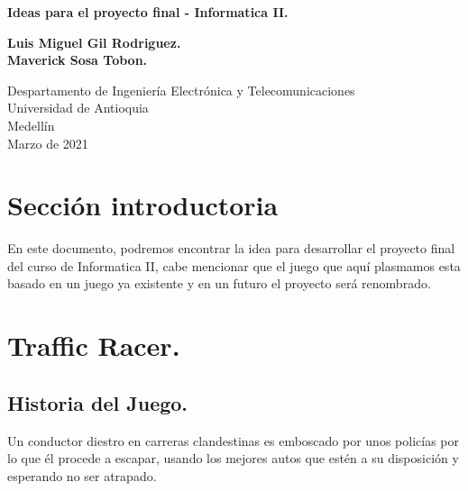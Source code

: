 \documentclass{article}
\begin{document}
\begin{titlepage}
    \begin{center}
        \vspace*{1cm}
            
        \Huge
        \textbf{Ideas para el proyecto final - Informatica II.}
            
        \vspace{0.5cm}
        \LARGE
            
        \vspace{1.5cm}
            
        \textbf{Luis Miguel Gil Rodriguez.}
        \\
        \textbf{Maverick Sosa Tobon.}
        \vfill
        \vspace{0.8cm}
            
        \Large
        Despartamento de Ingeniería Electrónica y Telecomunicaciones\\
        Universidad de Antioquia\\
        Medellín\\
        Marzo de 2021
            
    \end{center}
\end{titlepage}
\tableofcontents
\newpage
\section{Sección introductoria} \label{intro}
En este documento, podremos encontrar la idea para desarrollar el proyecto final del curso de Informatica II, cabe mencionar que el juego que aquí plasmamos esta basado en un juego ya existente y en un futuro el proyecto será renombrado.
\section{Traffic Racer.} 
\subsection{Historia del Juego.}
Un conductor diestro en carreras clandestinas es emboscado por unos policías por lo que él procede a escapar, usando los mejores autos que estén a su disposición y esperando no ser atrapado.
\end{document}
